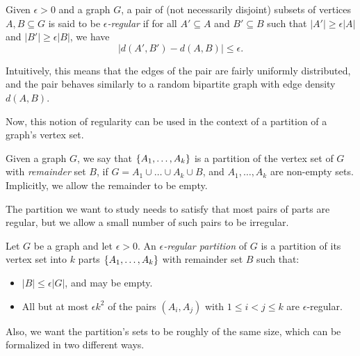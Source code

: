         \begin{definition}
            Given $\epsilon > 0$ and a graph $G$, a pair of (not necessarily disjoint) subsets of vertices $A, B \subseteq G$
            is said to be \emph{$\epsilon$-regular} if for all $A' \subseteq A$ and $B' \subseteq B$ such that
            $|A'| \geq \epsilon |A|$ and $|B'| \geq \epsilon |B|$, we have
            \[
                |d(A', B') - d(A, B)| \leq \epsilon.
            \]
        \end{definition}

        Intuitively, this means that the edges of the pair are fairly uniformly distributed, and the pair behaves
        similarly to a random bipartite graph with edge density $d(A, B)$.

        Now, this notion of regularity can be used in the context of a partition of a graph's vertex set.

        \begin{definition}
            Given a graph $G$, we say that $\{ A_1, \ldots, A_k \}$ is a partition of the vertex set of $G$ with
            \emph{remainder} set $B$, if $G = A_1 \cup \dots \cup A_k \cup B$, and $A_1, \dots, A_k$ are non-empty sets.
            Implicitly, we allow the remainder to be empty.
        \end{definition}

        The partition we want to study needs to satisfy that most pairs of parts are regular,
        but we allow a small number of such pairs to be irregular.

        \begin{definition} \label{def:regular_partition}
            Let $G$ be a graph and let $\epsilon > 0$.
            An \emph{$\epsilon$-regular partition} of $G$ is a partition of its vertex set into $k$ parts
            $\{ A_1, \ldots, A_k \}$ with remainder set $B$ such that:
            \begin{itemize}
                \item $|B| \leq \epsilon |G|$, and may be empty.
                \item All but at most $\epsilon k^2$ of the pairs $(A_i, A_j)$ with $1 \leq i < j \leq k$ are
                    $\epsilon$-regular.
            \end{itemize}
        \end{definition}

        Also, we want the partition's sets to be roughly of the same size, which can be formalized in two different ways.

